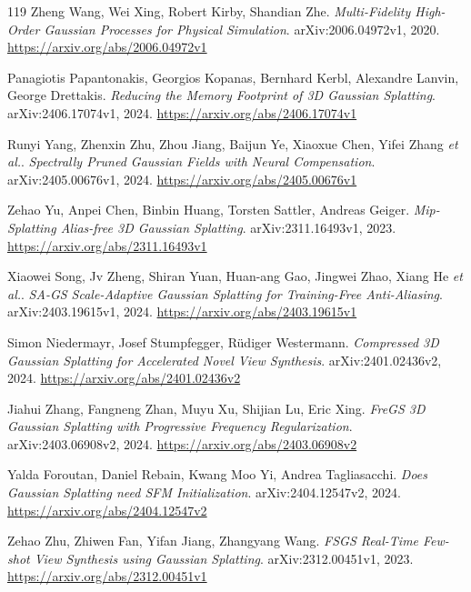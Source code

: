 \documentclass[11pt,a4paper]{article}
\begin{document}
\begin{thebibliography}{119}
Zheng Wang, Wei Xing, Robert Kirby, Shandian Zhe.
\newblock \emph{Multi-Fidelity High-Order Gaussian Processes for Physical Simulation}.
\newblock arXiv:2006.04972v1, 2020.
\newblock \url{https://arxiv.org/abs/2006.04972v1}

Panagiotis Papantonakis, Georgios Kopanas, Bernhard Kerbl, Alexandre Lanvin, George Drettakis.
\newblock \emph{Reducing the Memory Footprint of 3D Gaussian Splatting}.
\newblock arXiv:2406.17074v1, 2024.
\newblock \url{https://arxiv.org/abs/2406.17074v1}

Runyi Yang, Zhenxin Zhu, Zhou Jiang, Baijun Ye, Xiaoxue Chen, Yifei Zhang \emph{et al.}.
\newblock \emph{Spectrally Pruned Gaussian Fields with Neural Compensation}.
\newblock arXiv:2405.00676v1, 2024.
\newblock \url{https://arxiv.org/abs/2405.00676v1}

Zehao Yu, Anpei Chen, Binbin Huang, Torsten Sattler, Andreas Geiger.
\newblock \emph{Mip-Splatting Alias-free 3D Gaussian Splatting}.
\newblock arXiv:2311.16493v1, 2023.
\newblock \url{https://arxiv.org/abs/2311.16493v1}

Xiaowei Song, Jv Zheng, Shiran Yuan, Huan-ang Gao, Jingwei Zhao, Xiang He \emph{et al.}.
\newblock \emph{SA-GS Scale-Adaptive Gaussian Splatting for Training-Free Anti-Aliasing}.
\newblock arXiv:2403.19615v1, 2024.
\newblock \url{https://arxiv.org/abs/2403.19615v1}

Simon Niedermayr, Josef Stumpfegger, R\"{u}diger Westermann.
\newblock \emph{Compressed 3D Gaussian Splatting for Accelerated Novel View Synthesis}.
\newblock arXiv:2401.02436v2, 2024.
\newblock \url{https://arxiv.org/abs/2401.02436v2}

Jiahui Zhang, Fangneng Zhan, Muyu Xu, Shijian Lu, Eric Xing.
\newblock \emph{FreGS 3D Gaussian Splatting with Progressive Frequency Regularization}.
\newblock arXiv:2403.06908v2, 2024.
\newblock \url{https://arxiv.org/abs/2403.06908v2}

Yalda Foroutan, Daniel Rebain, Kwang Moo Yi, Andrea Tagliasacchi.
\newblock \emph{Does Gaussian Splatting need SFM Initialization}.
\newblock arXiv:2404.12547v2, 2024.
\newblock \url{https://arxiv.org/abs/2404.12547v2}

Zehao Zhu, Zhiwen Fan, Yifan Jiang, Zhangyang Wang.
\newblock \emph{FSGS Real-Time Few-shot View Synthesis using Gaussian Splatting}.
\newblock arXiv:2312.00451v1, 2023.
\newblock \url{https://arxiv.org/abs/2312.00451v1}


\end{thebibliography}
\end{document}
